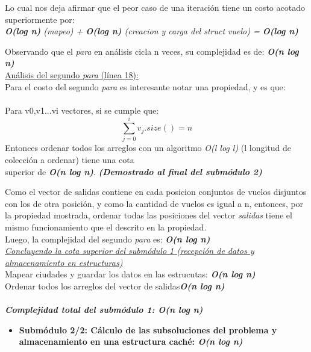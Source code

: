 \documentclass[10pt,a4paper]{article}
\begin{document}
\noindent Lo cual nos deja afirmar que el peor caso de una iteración tiene un costo acotado superiormente por:\\
\indent	\textit{\textbf{O(log n)} (mapeo) + \textbf{O(log n)} (creacion y carga del struct vuelo) = \textbf{O(log n)}}

\noindent Observando que el \textit{para} en análisis cicla n veces, su complejidad es de: \textit{\textbf{O(n log n)}}\\

\underline{Análisis del segundo \textit{para} (línea 18):}\\
\noindent Para el costo del segundo \textit{para} es interesante notar una propiedad, y es que:\\ \\
\indent Para v0,v1...vi vectores, si se cumple que:
\[
\sum_{j=0}^{i}v_{j}.size() = n 
\]
\indent Entonces ordenar todos los arreglos con un algoritmo \textit{O(l log l)} (l longitud de colección a ordenar) tiene una cota\\ \indent superior de \textit{\textbf{O(n log n)}}. \textit{\textbf{(Demostrado al final del submódulo 2)}}

\noindent Como el vector de salidas contiene en cada posicion conjuntos de vuelos disjuntos con los de otra posición, y como la cantidad de vuelos es igual a n, entonces, por la propiedad mostrada, ordenar todas las posiciones del vector \textit{salidas} tiene el mismo funcionamiento que el descrito en la propiedad.\\
Luego, la complejidad del segundo \textit{para} es: \textbf{\textit{O(n log n)}}\\

\noindent \underline{\textit{Concluyendo la cota superior del submódulo 1 (recepción de datos y almacenamiento en estructuras)}}\\
\indent Mapear ciudades y guardar los datos en las estrucutas: \textbf{\textit{O(n log n)}}\\
\indent Ordenar todos los arreglos del vector de salidas\hspace{36 px}\textbf{\textit{O(n log n)}}\\ \\
\textbf{\textit{Complejidad total del submódulo 1: O(n log n)}}

\newpage
\begin{itemize}
\item \textbf{Submódulo 2/2: Cálculo de las subsoluciones del problema y almacenamiento en una estructura caché: \textit{O(n log n)}}\\
\end{itemize}
\end{document}
